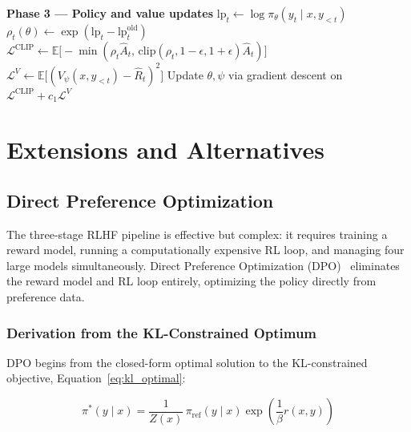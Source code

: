 \documentclass{book}
\begin{document}
\begin{algorithm}[H]
\begin{algorithmic}[1]
    \State \textbf{Phase 3 --- Policy and value updates}
            \State $\mathrm{lp}_t \leftarrow
                \log \pi_\theta(y_t \mid x, y_{<t})$
            \State $\rho_t(\theta) \leftarrow
                \exp(\mathrm{lp}_t - \mathrm{lp}^{\text{old}}_t)$
            \State $\mathcal{L}^{\text{CLIP}} \leftarrow
                \mathbb{E}\bigl[-\min(\rho_t \hat{A}_t,\,
                \mathrm{clip}(\rho_t, 1{-}\epsilon, 1{+}\epsilon)
                \hat{A}_t)\bigr]$
            \State $\mathcal{L}^{V} \leftarrow
                \mathbb{E}\bigl[(V_\psi(x, y_{<t}) - \hat{R}_t)^2\bigr]$
            \State Update $\theta, \psi$ via gradient descent on
                $\mathcal{L}^{\text{CLIP}} + c_1 \mathcal{L}^{V}$
        \EndFor
    \EndFor
{}
\end{algorithmic}
\end{algorithm}

\section{Extensions and Alternatives}
\label{sec:rlhf_extensions}

\subsection{Direct Preference Optimization}
\label{sec:dpo}

The three-stage RLHF pipeline is effective but complex: it requires
training a reward model, running a computationally expensive RL loop, and
managing four large models simultaneously. Direct Preference Optimization
(DPO)~\cite{rafailov2023} eliminates the reward model and RL loop entirely,
optimizing the policy directly from preference data.

\subsubsection{Derivation from the KL-Constrained Optimum}
\label{sec:dpo_derivation}

DPO begins from the closed-form optimal solution to the KL-constrained
objective, Equation~\ref{eq:kl_optimal}:

\begin{equation}
\pi^*(y \mid x)
= \frac{1}{Z(x)}\, \pi_{\text{ref}}(y \mid x)
    \exp\!\left(\frac{1}{\beta} r(x, y)\right)
\end{equation}
\end{document}
